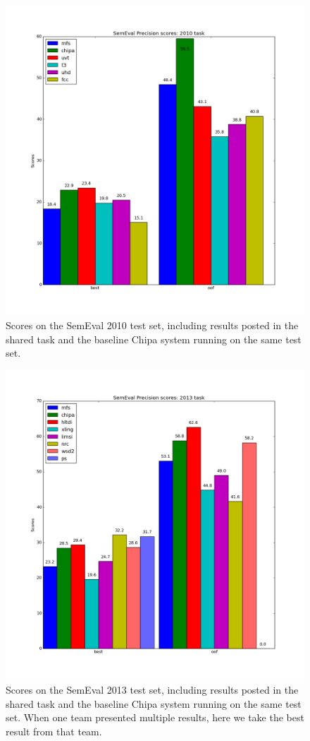 \begin{figure}
  \includegraphics[width=\textwidth]{semeval-2010-ch4.png}
  \caption{Scores on the SemEval 2010 test set, including results posted in
  the shared task and the baseline Chipa system running on the same test set.}
  \label{fig:semeval2010:ch4}
\end{figure}

\begin{figure}
  \includegraphics[width=\textwidth]{semeval-2013-ch4.png}
  \caption{Scores on the SemEval 2013 test set, including results posted in
  the shared task and the baseline Chipa system running on the same test set.
  When one team presented multiple results, here we take the best result from
  that team.}
  \label{fig:semeval2013:ch4}
\end{figure}

